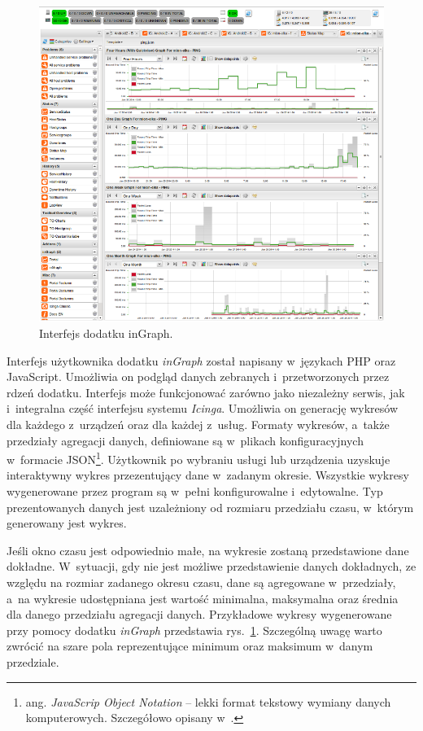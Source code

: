 \begin{figure}[ht]
  \caption{Interfejs dodatku inGraph.}
  \label{fig:inGraph}
\includegraphics[width=1\textwidth]{img/ingraph.png}
\end{figure}

Interfejs użytkownika dodatku {\em inGraph} został napisany w~językach PHP
oraz JavaScript. Umożliwia on podgląd danych zebranych
i~przetworzonych przez rdzeń dodatku. Interfejs może funkcjonować
zarówno jako niezależny serwis, jak i~integralna część interfejsu
systemu {\em Icinga}. Umożliwia on generację wykresów dla każdego z~urządzeń
oraz dla każdej z~usług. Formaty wykresów, a~także przedziały
agregacji danych, definiowane są w~plikach konfiguracyjnych w~formacie
JSON\footnote{ang. {\em JavaScrip Object Notation} -- lekki format
  tekstowy wymiany danych komputerowych. Szczegółowo opisany
  w~\cite{www:JSON}.}. Użytkownik po wybraniu usługi lub urządzenia
uzyskuje interaktywny wykres przezentujący dane w~zadanym
okresie. Wszystkie wykresy wygenerowane przez program są w~pełni
konfigurowalne i~edytowalne. Typ prezentowanych danych jest
uzależniony od rozmiaru przedziału czasu, w~którym generowany jest
wykres.

Jeśli okno czasu jest odpowiednio małe, na wykresie zostaną
przedstawione dane dokładne. W~sytuacji, gdy nie jest możliwe
przedstawienie danych dokładnych, ze względu na rozmiar zadanego
okresu czasu, dane są agregowane w~przedziały, a~na wykresie
udostępniana jest wartość minimalna, maksymalna oraz średnia dla
danego przedziału agregacji danych. Przykładowe wykresy wygenerowane
przy pomocy dodatku {\em inGraph} przedstawia
rys.~\ref{fig:inGraph}. Szczególną uwagę warto zwrócić na szare pola
reprezentujące minimum oraz maksimum w~danym przedziale.


